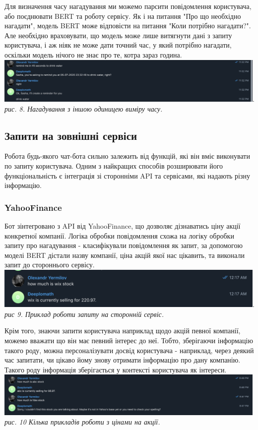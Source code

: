 Для визначення часу нагадування ми можемо парсити повідомлення користувача, або поєднювати BERT та роботу сервісу. Як і на питання "Про що необхідно нагадати", модель BERT може відповісти на питання "Коли потрібно нагадати?". Але необхідно враховувати, що модель може лише витягнути дані з запиту користувача, і аж ніяк не може дати точний час, у який потрібно нагадати, оскільки модель нічого не знає про те, котра зараз година.\\ 
\includegraphics[width=500]{Dissertation/remind_seconds.png}.\\
\textit{рис. 8. Нагадування з іншою одиницею виміру часу.}

\subsection{Запити на зовнішні сервіси}
Робота будь-якого чат-бота сильно залежить від функцій, які він вміє виконувати по запиту користувача. Одним з найкращих способів розширювати його функціональність є інтеграція зі сторонніми API та сервісами, які надають різну інформацію.  

\subsubsection{YahooFinance}
Бот зінтегровано з  API від YahooFinance, що дозволяє дізнаватись ціну акції конкретної компанії. Логіка обробки повідомлення схожа на логіку обробки запиту про нагадування - класифікували повідомлення як запит, за допомогою моделі BERT дістали назву компанії, ціна акцій якої нас цікавить, та виконали запит до стороннього сервісу.\\
\includegraphics[width=500]{Dissertation/stocks_working.png}.\\
\textit{рис 9. Приклад роботи  запиту на сторонній сервіс.}


Крім того, знаючи запити користувача наприклад щодо акцій певної компанії, можемо вважати що він має певний інтерес до неї. Тобто, зберігаючи інформацію такого роду, можна персоналізувати досвід користувача - наприклад, через деякий час запитати, чи цікаво йому знову отримати інформацію про дану компанію. Такого роду інформація зберігається у контексті користувача як інтереси. \\
\includegraphics[width = 500]{Dissertation/stocks_not_working.png}\\
\textit{рис. 10 Кілька прикладів роботи з цінами на акції.}


